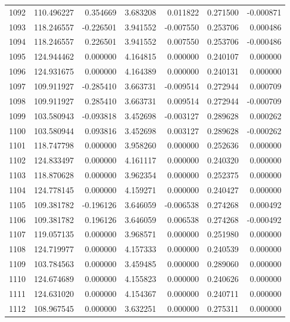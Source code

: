\begin{tabular}{rrrrrrr}
1092 & 110.496227 &    0.354669 &  3.683208 &   0.011822 &   0.271500 & -0.000871 \\
1093 & 118.246557 &   -0.226501 &  3.941552 &  -0.007550 &   0.253706 &  0.000486 \\
1094 & 118.246557 &    0.226501 &  3.941552 &   0.007550 &   0.253706 & -0.000486 \\
1095 & 124.944462 &    0.000000 &  4.164815 &   0.000000 &   0.240107 &  0.000000 \\
1096 & 124.931675 &    0.000000 &  4.164389 &   0.000000 &   0.240131 &  0.000000 \\
1097 & 109.911927 &   -0.285410 &  3.663731 &  -0.009514 &   0.272944 &  0.000709 \\
1098 & 109.911927 &    0.285410 &  3.663731 &   0.009514 &   0.272944 & -0.000709 \\
1099 & 103.580943 &   -0.093818 &  3.452698 &  -0.003127 &   0.289628 &  0.000262 \\
1100 & 103.580944 &    0.093816 &  3.452698 &   0.003127 &   0.289628 & -0.000262 \\
1101 & 118.747798 &    0.000000 &  3.958260 &   0.000000 &   0.252636 &  0.000000 \\
1102 & 124.833497 &    0.000000 &  4.161117 &   0.000000 &   0.240320 &  0.000000 \\
1103 & 118.870628 &    0.000000 &  3.962354 &   0.000000 &   0.252375 &  0.000000 \\
1104 & 124.778145 &    0.000000 &  4.159271 &   0.000000 &   0.240427 &  0.000000 \\
1105 & 109.381782 &   -0.196126 &  3.646059 &  -0.006538 &   0.274268 &  0.000492 \\
1106 & 109.381782 &    0.196126 &  3.646059 &   0.006538 &   0.274268 & -0.000492 \\
1107 & 119.057135 &    0.000000 &  3.968571 &   0.000000 &   0.251980 &  0.000000 \\
1108 & 124.719977 &    0.000000 &  4.157333 &   0.000000 &   0.240539 &  0.000000 \\
1109 & 103.784563 &    0.000000 &  3.459485 &   0.000000 &   0.289060 &  0.000000 \\
1110 & 124.674689 &    0.000000 &  4.155823 &   0.000000 &   0.240626 &  0.000000 \\
1111 & 124.631020 &    0.000000 &  4.154367 &   0.000000 &   0.240711 &  0.000000 \\
1112 & 108.967545 &    0.000000 &  3.632251 &   0.000000 &   0.275311 &  0.000000 \\

\end{tabular}
